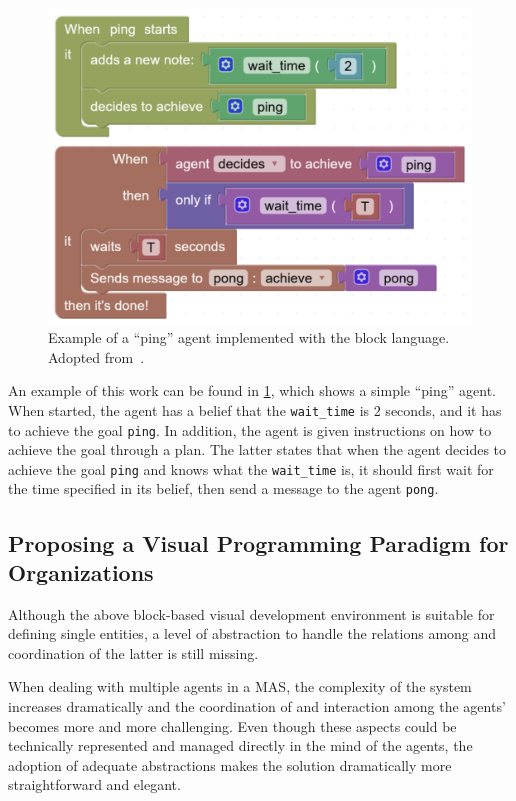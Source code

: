 \begin{figure}[H]
    \centering
    \includegraphics[width=0.8\linewidth]{images/blocks-example.png}
    \caption{Example of a ``ping'' agent implemented with the block language. Adopted from~\cite{burattini2022agent}.}
    \label{fig:blocks-example}
\end{figure}

An example of this work can be found in \cref{fig:blocks-example}, which shows a simple ``ping'' agent.
When started, the agent has a belief that the \texttt{wait\_time} is $2$ seconds, and it has to achieve the goal \texttt{ping}.
In addition, the agent is given instructions on how to achieve the goal through a plan.
The latter states that when the agent decides to achieve the goal \texttt{ping} and knows what the \texttt{wait\_time} is, it should first wait for the time specified in its belief, then send a message to the agent \texttt{pong}.

\subsection{Proposing a Visual Programming Paradigm for Organizations}
Although the above block-based visual development environment is suitable for defining single entities, a level of abstraction to handle the relations among and coordination of the latter is still missing.

When dealing with multiple agents in a MAS, the complexity of the system increases dramatically and the coordination of and interaction among the agents' becomes more and more challenging.
Even though these aspects could be technically represented and managed directly in the mind of the agents, the adoption of adequate abstractions makes the solution dramatically more straightforward and elegant. \cite{boissier2020multi}

